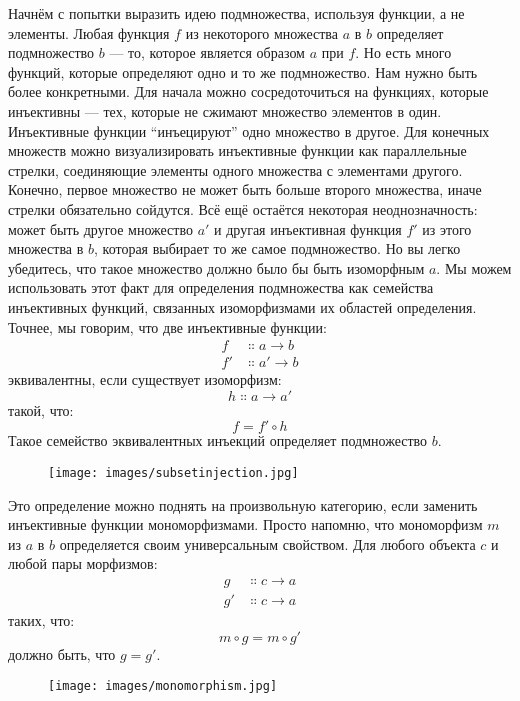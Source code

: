 Начнём с попытки выразить идею подмножества, используя функции,
а не элементы. Любая функция $f$ из некоторого множества $a$
в $b$ определяет подмножество $b$ — то, которое является образом
$a$ при $f$. Но есть много функций, которые определяют
одно и то же подмножество. Нам нужно быть более конкретными. Для начала можно
сосредоточиться на функциях, которые инъективны --- тех, которые не сжимают множество
элементов в один. Инъективные функции ``инъецируют'' одно множество в другое.
Для конечных множеств можно визуализировать инъективные функции как параллельные
стрелки, соединяющие элементы одного множества с элементами другого. Конечно,
первое множество не может быть больше второго множества, иначе стрелки обязательно
сойдутся. Всё ещё остаётся некоторая неоднозначность: может быть
другое множество $a'$ и другая инъективная функция
$f'$ из этого множества в $b$, которая выбирает то же самое
подмножество. Но вы легко убедитесь, что такое множество должно было бы
быть изоморфным $a$. Мы можем использовать этот факт для определения подмножества
как семейства инъективных функций, связанных изоморфизмами их
областей определения. Точнее, мы говорим, что две инъективные функции:
\begin{align*}
  f  & \Colon a \to b  \\
  f' & \Colon a' \to b
\end{align*}
эквивалентны, если существует изоморфизм:
\[h \Colon a \to a'\]
такой, что:
\[f = f' \circ h\]
Такое семейство эквивалентных инъекций определяет подмножество $b$.

\begin{figure}[H]
  \centering
  \texttt{[image: images/subsetinjection.jpg]}
\end{figure}

\noindent
Это определение можно поднять на произвольную категорию, если заменить
инъективные функции мономорфизмами. Просто напомню, что
мономорфизм $m$ из $a$ в $b$ определяется своим
универсальным свойством. Для любого объекта $c$ и любой пары морфизмов:
\begin{align*}
  g  & \Colon c \to a \\
  g' & \Colon c \to a
\end{align*}
таких, что:
\[m \circ g = m \circ g'\]
должно быть, что $g = g'$.

\begin{figure}[H]
  \centering
  \texttt{[image: images/monomorphism.jpg]}
\end{figure}

